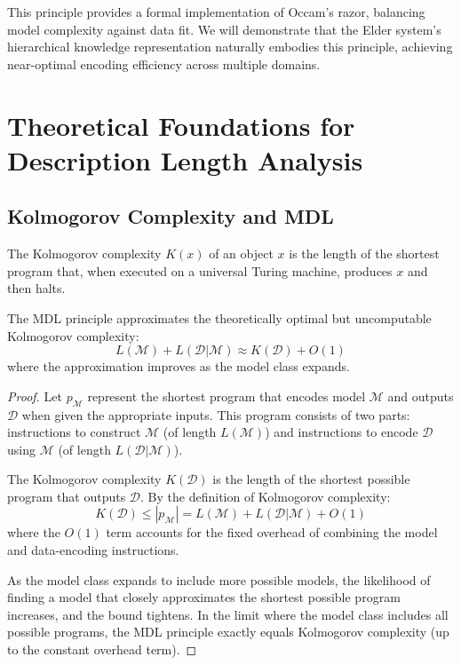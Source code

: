 This principle provides a formal implementation of Occam's razor, balancing model complexity against data fit. We will demonstrate that the Elder system's hierarchical knowledge representation naturally embodies this principle, achieving near-optimal encoding efficiency across multiple domains.

\section{Theoretical Foundations for Description Length Analysis}

\subsection{Kolmogorov Complexity and MDL}

\begin{definition}
The Kolmogorov complexity $K(x)$ of an object $x$ is the length of the shortest program that, when executed on a universal Turing machine, produces $x$ and then halts.
\end{definition}

\begin{theorem}
The MDL principle approximates the theoretically optimal but uncomputable Kolmogorov complexity:
\begin{equation}
L(\mathcal{M}) + L(\mathcal{D} | \mathcal{M}) \approx K(\mathcal{D}) + O(1)
\end{equation}
where the approximation improves as the model class expands.
\end{theorem}

\begin{proof}
Let $p_{\mathcal{M}}$ represent the shortest program that encodes model $\mathcal{M}$ and outputs $\mathcal{D}$ when given the appropriate inputs. This program consists of two parts: instructions to construct $\mathcal{M}$ (of length $L(\mathcal{M})$) and instructions to encode $\mathcal{D}$ using $\mathcal{M}$ (of length $L(\mathcal{D} | \mathcal{M})$).

The Kolmogorov complexity $K(\mathcal{D})$ is the length of the shortest possible program that outputs $\mathcal{D}$. By the definition of Kolmogorov complexity:
\begin{equation}
K(\mathcal{D}) \leq |p_{\mathcal{M}}| = L(\mathcal{M}) + L(\mathcal{D} | \mathcal{M}) + O(1)
\end{equation}
where the $O(1)$ term accounts for the fixed overhead of combining the model and data-encoding instructions.

As the model class expands to include more possible models, the likelihood of finding a model that closely approximates the shortest possible program increases, and the bound tightens. In the limit where the model class includes all possible programs, the MDL principle exactly equals Kolmogorov complexity (up to the constant overhead term).
\end{proof}

